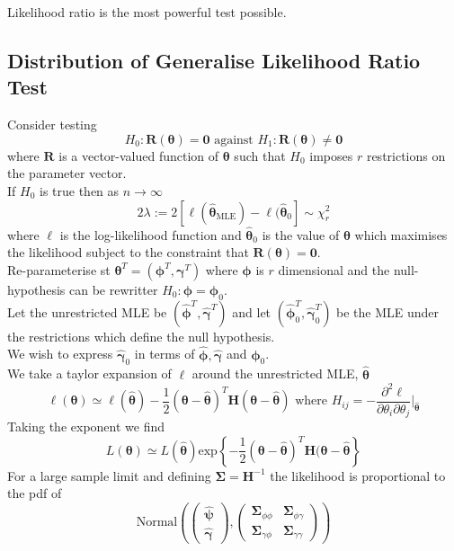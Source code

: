 \documentclass[11pt,a4paper]{article}
\begin{document}
Likelihood ratio is the most powerful test possible.\\

\subsection{Distribution of Generalise Likelihood Ratio Test}

Consider testing
$$H_0:\textbf{R}(\pmb\theta)=\pmb0\text{ against }H_1:\textbf{R}(\pmb\theta)\neq\pmb0$$
where $\textbf{R}$ is a vector-valued function of $\pmb\theta$ such that $H_0$ imposes $r$ restrictions on the parameter vector.\\
If $H_0$ is true then as $n\to\infty$
$$2\lambda:=2[\ell(\hat{\pmb\theta}_\text{MLE})-\ell(\hat{\pmb\theta}_0]\sim\chi^2_r$$
where $\ell$ is the log-likelihood function and $\hat{\pmb\theta}_0$ is the value of $\pmb\theta$ which maximises the likelihood subject to the constraint that $\textbf{R}(\pmb\theta)=\pmb0$.\\
Re-parameterise st $\pmb\theta^T=(\pmb\phi^T,\pmb\gamma^T)$ where $\pmb\phi$ is $r$ dimensional and the null-hypothesis can be rewritter $H_0:\pmb\phi=\pmb\phi_0$.\\
Let the unrestricted MLE be $(\hat{\pmb\phi}^T,\hat{\pmb\gamma}^T)$ and let $(\hat{\pmb\phi}_0^T,\hat{\pmb\gamma}_0^T)$ be the MLE under the restrictions which define the null hypothesis.\\
We wish to express $\hat{\pmb\gamma}_0$ in terms of $\hat{\pmb\phi},\hat{\pmb\gamma}$ and $\pmb\phi_0$.\\
We take a taylor expansion of $\ell$ around the unrestricted MLE, $\hat{\pmb\theta}$
$$\ell(\pmb\theta)\simeq\ell(\hat{\pmb\theta})-\frac12(\pmb\theta-\hat{\pmb\theta})^T\textbf{H}(\pmb\theta-\hat{\pmb\theta})\text{ where }H_{ij}=-\frac{\partial^2\ell}{\partial\theta_i\partial\theta_j}\bigg|_{\hat{\pmb\theta}}$$
Taking the exponent we find
$$L(\pmb\theta)\simeq L(\hat{\pmb\theta})\text{exp}\left\{-\frac12(\pmb\theta-\hat{\pmb\theta})^T\textbf{H}(\pmb\theta-\hat{\pmb\theta}\right\}$$
For a large sample limit and defining $\pmb\Sigma=\textbf{H}^{-1}$ the likelihood is proportional to the pdf of
$$\text{Normal}\left(\begin{pmatrix}\hat{\pmb\psi}\\\hat{\pmb\gamma}\end{pmatrix},\begin{pmatrix}\pmb\Sigma_{\phi\phi}&\pmb\Sigma_{\phi\gamma}\\\pmb\Sigma_{\gamma\phi}&\pmb\Sigma_{\gamma\gamma}\end{pmatrix}\right)$$
\end{document}
